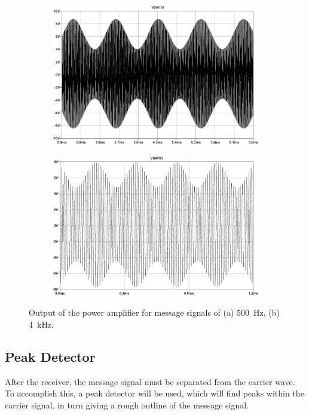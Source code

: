 \documentclass[11pt,letter,notitlepage]{article}
\begin{document}
	\begin{figure}[h]	
		\centering
		\begin{subfigure}{\linewidth}
			\centering
			\includegraphics[width=0.9\linewidth]{poweramp/poweramp500img}
			\caption{}
			\label{fig:poweramp500img}
		\end{subfigure}
		
		\begin{subfigure}{0.9\linewidth}
			\centering
			\includegraphics[width=\linewidth]{poweramp/poweramp4kimg}
			\caption{}
			\label{fig:poweramp4kimg}
		\end{subfigure}
		
		\caption{Output of the power amplifier for message signals of (a) \SI{500}{\Hz}, (b) \SI{4}{\kHz}.}
		\label{fig:poweramp}
	\end{figure}

	\clearpage %
	\subsection{Peak Detector}
	After the receiver, the message signal must be separated from the carrier wave. To accomplish this, a peak detector will be used, which will find peaks within the carrier signal, in turn giving a rough outline of the message signal.
	
\end{document}
